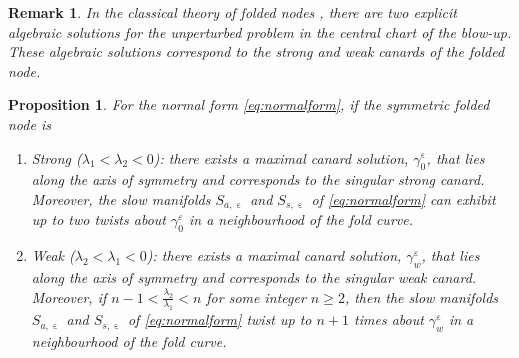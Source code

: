 \documentclass[10pt,onecolumn]{article}
\theoremstyle{plain}
\newtheorem{proposition}{Proposition}[section]
\newtheorem{remark}{Remark}[section]
\DeclareMathOperator{\eps}{\varepsilon}
\begin{document}
\medskip

\begin{remark}
In the classical theory of folded nodes \cite{Szmolyan2001,Wex2005}, there are two explicit algebraic solutions for the unperturbed problem in the central chart of the blow-up. These algebraic solutions correspond to the strong and weak canards of the folded node. %
\end{remark}

\medskip

\begin{proposition} \label{prop:rotations}
For the normal form \eqref{eq:normalform}, if the symmetric folded node is
\begin{enumerate}[label=(\roman*)]
  \item Strong ($\lambda_1<\lambda_2<0$): there exists a maximal canard solution, $\gamma_0^{\eps}$, that lies along the axis of symmetry and corresponds to the singular strong canard. Moreover, the slow manifolds $S_{a,\eps}$ and $S_{s,\eps}$ of \eqref{eq:normalform} can exhibit up to two twists about $\gamma_0^\varepsilon$ in a neighbourhood of the fold curve. %
  \item Weak ($\lambda_2<\lambda_1<0$): there exists a maximal canard solution, $\gamma_w^{\eps}$, that lies along the axis of symmetry and corresponds to the singular weak canard. Moreover, if $n-1 < \tfrac{\lambda_2}{\lambda_1} < n$ for some integer $n\geq 2$, then the slow manifolds $S_{a,\eps}$ and $S_{s,\eps}$ of \eqref{eq:normalform} twist up to $n+1$ times about $\gamma_w^{\eps}$ in a neighbourhood of the fold curve.%
\end{enumerate}
\end{proposition}
\end{document}
